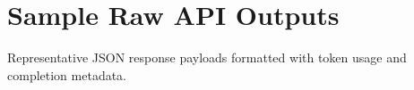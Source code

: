 
\chapter{Sample Raw API Outputs}
\label{app:raw_outputs}

Representative JSON response payloads formatted with token usage and completion metadata.

